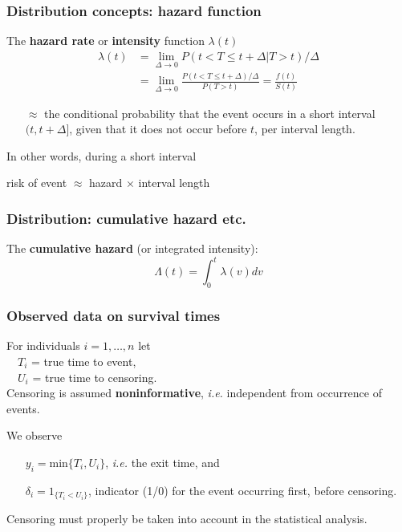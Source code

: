 \documentclass[12pt]{beamer}
\begin{document}
\begin{frame}

\frametitle{Distribution concepts: hazard function}

The \textbf{hazard rate} or \textbf{intensity} function $\lambda(t)$
\begin{align*}
\lambda(t) & = \underset{\Delta \rightarrow 0}{\lim} 
 {P(t < T \le t+\Delta | T > t)}/{\Delta} \\
   & = \underset{\Delta \rightarrow 0}{\lim} 
      \frac{P(t < T \le t+\Delta)/\Delta }{P(T > t)}
     = \frac{f(t)}{S(t)}  
\end{align*}
\begin{itemize}
\item[$\approx$]  the conditional probability that
the event occurs in a short
 interval $(t, t+\Delta]$, given that it does not
occur before $t$, per interval length. 
\end{itemize}

In other words, during a short interval
 \begin{center}
 risk of event $\approx$ hazard $\times$ interval length 
 \end{center}

\end{frame}

\begin{frame}
\frametitle{Distribution: cumulative hazard etc.}

The \textbf{cumulative hazard} (or integrated intensity):
\[
\Lambda(t) = \int_0^t \lambda(v)dv
\]

\end{frame}


\begin{frame}
\frametitle{Observed data on survival times}

For individuals $i = 1, \dots, n$ let \\
$\quad T_i$ = true time to event,\\
$\quad U_i$ = true time to censoring.\\
 Censoring is assumed \textbf{noninformative}, \textit{i.e.} independent 
 from occurrence of events.
 
We observe 
\begin{itemize}
\item[ ]
$y_i = \text{min}\{ T_i, U_i \}$, \textit{i.e.}
the exit time, and
\item[ ]
 $ \delta_{i} = 1_{ \{ T_i < U_i  \} }$, 
  indicator (1/0) for the event occurring first, before censoring. 
\end{itemize}

Censoring must properly be taken into account in the statistical analysis.


\end{frame}
\end{document}
